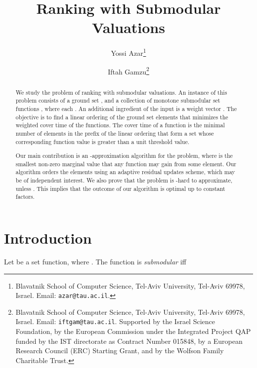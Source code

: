 \documentclass[11pt]{article}
\theoremstyle{plain}
\theoremstyle{definition}
\begin{document}
\begin{titlepage}
\title{Ranking with Submodular Valuations}
\author{
Yossi Azar\thanks{Blavatnik School of Computer Science, Tel-Aviv
University, Tel-Aviv 69978, Israel. Email: {\tt azar@tau.ac.il}.}
    \and
Iftah Gamzu\thanks{Blavatnik School of Computer Science, Tel-Aviv
University, Tel-Aviv 69978, Israel. Email: {\tt iftgam@tau.ac.il}.
Supported by the Israel Science Foundation, by the European
Commission under the Integrated Project QAP funded by the IST
directorate as Contract Number 015848, by a European Research
Council (ERC) Starting Grant, and by the Wolfson Family Charitable
Trust.} }
\date{}
\maketitle


\begin{abstract}

We study the problem of ranking with submodular valuations. An
instance of this problem consists of a ground set , and a
collection of  monotone submodular set functions , where each . An additional
ingredient of the input is a weight vector . The
objective is to find a linear ordering of the ground set elements
that minimizes the weighted cover time of the functions. The cover
time of a function is the minimal number of elements in the prefix
of the linear ordering that form a set whose corresponding
function value is greater than a unit threshold value.

Our main contribution is an -approximation
algorithm for the problem, where  is the smallest
non-zero marginal value that any function may gain from some
element. Our algorithm orders the elements using an adaptive
residual updates scheme, which may be of independent interest. We
also prove that the problem is -hard to
approximate, unless . This implies that
the outcome of our algorithm is optimal up to constant factors.
\end{abstract}

\thispagestyle{empty}
\end{titlepage}


\section{Introduction} \label{sec:Intro}

Let  be a set function, where . The function  is \emph{submodular} iff
\end{document}

